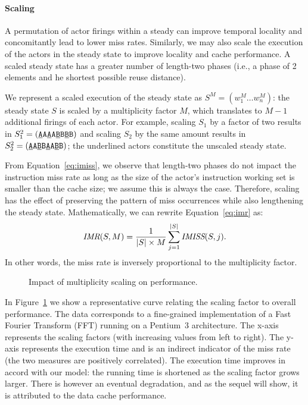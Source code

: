 \paragraph*{Scaling} A permutation of actor firings within a steady
can improve temporal locality and concomitantly lead to lower miss
rates. Similarly, 
we may also scale the execution of the actors in the steady state to
improve locality and cache performance. A scaled steady state has a
greater number of length-two phases (i.e., a phase of 2 elements and
he shortest possible reuse distance). 

We represent a scaled execution of the steady state as
$S^M=(w_1^M\dots w_n^M)$: the steady state $S$ is scaled by a
multiplicity factor $M$, which translates to $M-1$ additional firings of
each actor. For example, scaling $S_1$ by a factor of two results in
$S_1^2=(\texttt{\underline{A}A\underline{A}A\underline{B}B\underline{B}B})$
and scaling $S_2$ by the same amount results in 
$S_2^2=(\texttt{\underline{A}A\underline{B}B\underline{A}A\underline{B}B})$;
the underlined actors constitute the unscaled steady state.

From Equation~\ref{eq:imiss}, we observe that length-two  phases do
not impact the instruction miss rate  as long as the size of the actor's 
instruction working set  is smaller than the cache
size; we assume this is always the case. Therefore, scaling has the
effect of preserving the pattern of 
miss occurrences while also lengthening the steady state. Mathematically,
we can rewrite Equation~\ref{eq:imr} as:
\begin{equation}
\label{eq:imrM}
  \mbox{\it IMR}(S, M) = \frac{1}{|S|\times M}\sum_{j=1}^{|S|} \mbox{\it IMISS}(S,j).
\end{equation}
In other words, the miss rate is inversely proportional to the
multiplicity factor.
\begin{figure}[t]
\begin{center}
  \caption{Impact of multiplicity scaling on performance.}
 \label{fig:scaling-data}
\end{center}
\end{figure}

In Figure~\ref{fig:scaling-data} we show a
representative curve relating the scaling factor to overall
performance. The data corresponds to a fine-grained implementation of 
a Fast Fourier Transform (FFT) running on a Pentium~3 architecture. The
x-axis represents the scaling factors (with increasing values from
left to right). The y-axis represents the execution time and is an
indirect indicator of the miss rate (the two measures are positively
correlated). The execution time improves in accord with our model: 
the running time is shortened as the scaling factor grows larger. There
is however an eventual degradation, and as the sequel will show, it is 
attributed to the data cache performance.
